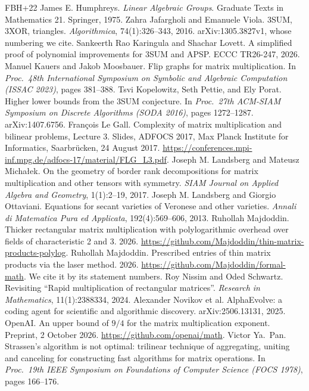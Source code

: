 \documentclass[11pt]{article}
\theoremstyle{definition}
\theoremstyle{remark}
\newcommand{\CPid}{\url{https://github.com/Majdoddin/formal-math}}
\begin{document}
{\begin{thebibliography}{FBH{+}22}
 James E. Humphreys. \emph{Linear Algebraic Groups}. Graduate Texts in Mathematics 21. Springer, 1975.
 Zahra Jafargholi and Emanuele Viola. 3SUM, 3XOR, triangles. \emph{Algorithmica}, 74(1):326--343, 2016. arXiv:1305.3827v1, whose numbering we cite.
 Sankeerth Rao Karingula and Shachar Lovett. A simplified proof of polynomial improvements for 3SUM and APSP. ECCC TR26-247, 2026.
 Manuel Kauers and Jakob Moosbauer. Flip graphs for matrix multiplication. In \emph{Proc.\ 48th International Symposium on Symbolic and Algebraic Computation (ISSAC 2023)}, pages 381--388.
 Tsvi Kopelowitz, Seth Pettie, and Ely Porat. Higher lower bounds from the 3SUM conjecture. In \emph{Proc.\ 27th ACM-SIAM Symposium on Discrete Algorithms (SODA 2016)}, pages 1272--1287. arXiv:1407.6756.
 François Le Gall. Complexity of matrix multiplication and bilinear problems, Lecture 3. Slides, ADFOCS 2017, Max Planck Institute for Informatics, Saarbrücken, 24 August 2017. \url{https://conferences.mpi-inf.mpg.de/adfocs-17/material/FLG_L3.pdf}.
 Joseph M. Landsberg and Mateusz Michałek. On the geometry of border rank decompositions for matrix multiplication and other tensors with symmetry. \emph{SIAM Journal on Applied Algebra and Geometry}, 1(1):2--19, 2017.
 Joseph M. Landsberg and Giorgio Ottaviani. Equations for secant varieties of Veronese and other varieties. \emph{Annali di Matematica Pura ed Applicata}, 192(4):569--606, 2013.
 Ruhollah Majdoddin. Thicker rectangular matrix multiplication with polylogarithmic overhead over fields of characteristic 2 and 3. 2026. \url{https://github.com/Majdoddin/thin-matrix-products-polylog}.
 Ruhollah Majdoddin. Prescribed entries of thin matrix products via the laser method. 2026. \CPid. We cite it by its statement numbers.%
 Roy Nissim and Oded Schwartz. Revisiting ``Rapid multiplication of rectangular matrices''. \emph{Research in Mathematics}, 11(1):2388334, 2024.
 Alexander Novikov et al. AlphaEvolve: a coding agent for scientific and algorithmic discovery. arXiv:2506.13131, 2025.
 OpenAI. An upper bound of $9/4$ for the matrix multiplication exponent. Preprint, 2 October 2026. \url{https://github.com/openai/math}.
 Victor Ya.\ Pan. Strassen's algorithm is not optimal: trilinear technique of aggregating, uniting and canceling for constructing fast algorithms for matrix operations. In \emph{Proc.\ 19th IEEE Symposium on Foundations of Computer Science (FOCS 1978)}, pages 166--176.

\end{thebibliography}}
\end{document}
